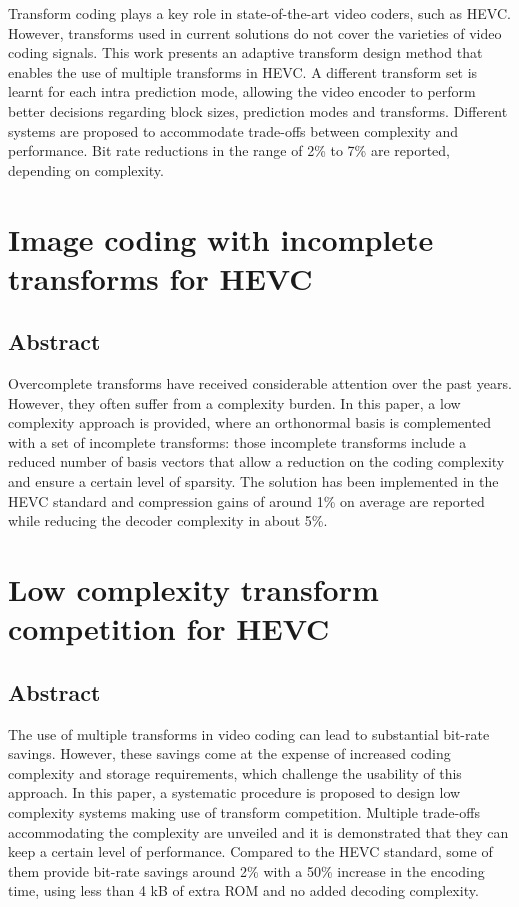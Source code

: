 \documentclass[11pt,a4paper,openright,twoside]{book}
\numberwithin{equation}{section} %
\numberwithin{figure}{section} %
\numberwithin{table}{section} %
\begin{document}
Transform coding plays a key role in state-of-the-art video coders, such as
\acs{HEVC}.
However, transforms used in current solutions do not cover the varieties
of video coding signals.
This work presents an adaptive transform design method that enables the use of
multiple transforms in \acs{HEVC}.
A different transform set is learnt for each intra prediction mode, allowing
the video encoder to perform better decisions regarding block sizes,
prediction modes and transforms.
Different systems are proposed to accommodate trade-offs between complexity
and performance.
Bit rate reductions in the range of 2\% to 7\% are reported, depending on
complexity.

\section*{Image coding with incomplete transforms for HEVC}
\label{sec:image_coding_with_incomplete_transforms_for_hevc}

\subsection*{Abstract}
\label{sub:it_bstract}

Overcomplete transforms have received considerable attention over the past
years.
However, they often suffer from a complexity burden.
In this paper, a low complexity approach is provided, where an orthonormal
basis is complemented with a set of incomplete transforms: those incomplete
transforms include a reduced number of basis vectors that allow a reduction on
the coding complexity and ensure a certain level of sparsity.
The solution has been implemented in the \acs{HEVC}  standard and compression
gains of around 1\% on average are reported while reducing the decoder
complexity in about 5\%.

\section*{Low complexity transform competition for HEVC}
\label{sec:low_complexity_transform_competition_for_hevc}

\subsection*{Abstract}
\label{sub:dtt_abstract}

The use of multiple transforms in video coding can lead to substantial
bit-rate savings.
However, these savings come at the expense of increased coding complexity and
storage requirements, which challenge the usability of this approach.
In this paper, a systematic procedure is proposed to design low complexity
systems making use of transform competition.
Multiple trade-offs accommodating the complexity are unveiled and it is
demonstrated that they can keep a certain level of performance.
Compared to the \acs{HEVC} standard, some of them provide bit-rate savings
around 2\% with a 50\% increase in the encoding time, using less than 4 kB of
extra ROM and no added decoding complexity.
\end{document}
